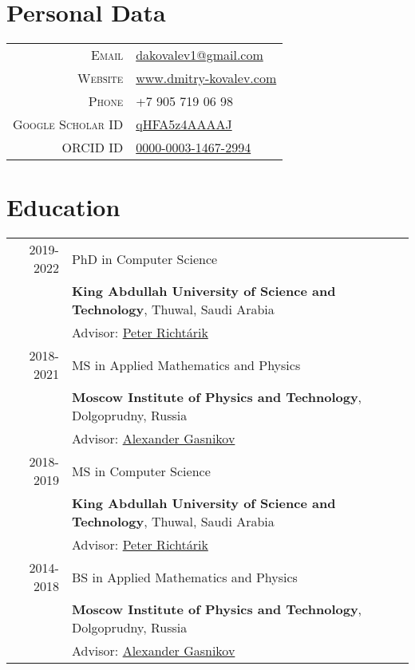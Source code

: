 \section{Personal Data}

\begin{tabular}{rl}
	\textsc{Email} & \href{mailto:dakovalev1@gmail.com}{dakovalev1@gmail.com}\\
	\textsc{Website} & \href{https://www.dmitry-kovalev.com}{www.dmitry-kovalev.com}\\
	\textsc{Phone} & +7 905 719 06 98\\
	\textsc{Google Scholar ID} &\href{https://scholar.google.com/citations?user=qHFA5z4AAAAJ}{qHFA5z4AAAAJ}\\
	\textsc{ORCID ID} & \href{https://orcid.org/0000-0003-1467-2994}{0000-0003-1467-2994}
\end{tabular}



\section{Education}
\begin{tabular}{rl}	
	\textsc{2019-2022}& PhD in Computer Science\\
	& \textbf{King Abdullah University of Science and Technology}, Thuwal, Saudi Arabia\\
	& Advisor: \href{https://richtarik.org}{Peter Richt\'{a}rik}\\
	\textsc{2018-2021}& MS in Applied Mathematics and Physics\\
	& \textbf{Moscow Institute of Physics and Technology}, Dolgoprudny, Russia\\
	& Advisor: \href{https://scholar.google.com/citations?user=AmeE8qkAAAAJ}{Alexander Gasnikov}\\
	\textsc{2018-2019}& MS in Computer Science\\
	& \textbf{King Abdullah University of Science and Technology}, Thuwal, Saudi Arabia\\
	& Advisor: \href{https://richtarik.org}{Peter Richt\'{a}rik}\\
	\textsc{2014-2018}& BS in Applied Mathematics and Physics\\
	& \textbf{Moscow Institute of Physics and Technology}, Dolgoprudny, Russia\\
	& Advisor: \href{https://scholar.google.com/citations?user=AmeE8qkAAAAJ}{Alexander Gasnikov}\\
\end{tabular}

